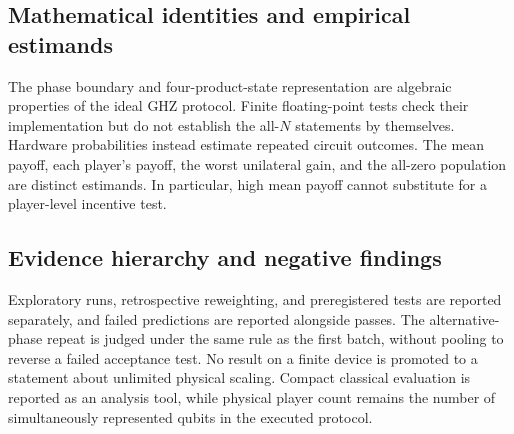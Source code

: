 \subsection{Mathematical identities and empirical estimands}
The phase boundary and four-product-state representation are algebraic
properties of the ideal GHZ protocol. Finite floating-point tests check
their implementation but do not establish the all-$N$ statements by
themselves. Hardware probabilities instead estimate repeated circuit
outcomes. The mean payoff, each player's payoff, the worst unilateral
gain, and the all-zero population are distinct estimands. In particular,
high mean payoff cannot substitute for a player-level incentive test.

\subsection{Evidence hierarchy and negative findings}
Exploratory runs, retrospective reweighting, and preregistered tests are
reported separately, and failed predictions are reported alongside passes.
The alternative-phase repeat is judged under the same rule as the first
batch, without pooling to reverse a failed acceptance test.
No result on a finite device is promoted to a statement about unlimited
physical scaling. Compact classical evaluation is reported as an analysis
tool, while physical player count remains the number of simultaneously
represented qubits in the executed protocol.

